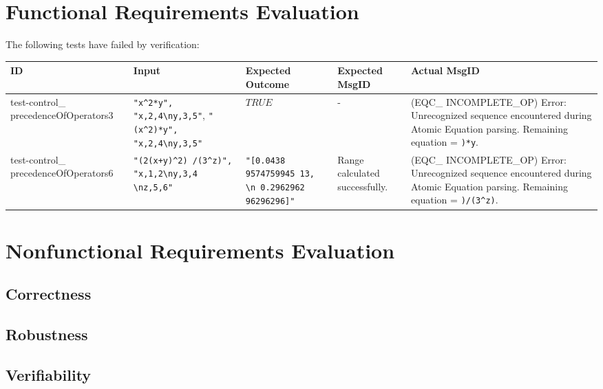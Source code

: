 \documentclass[12pt, titlepage]{article}
\begin{document}
\section{Functional Requirements Evaluation}

The following tests have failed by verification:

\begin{center}
	\begin{longtable}{ | p{3cm} | p{3cm} | p{2cm} | p{2cm} | p{3cm} |}
		 \hline \label{TblInputVar} 
		ID & Input & Expected Outcome & Expected MsgID & Actual MsgID \\ \hline
		test-control\_ precedenceOfOperators3 & \texttt{"x\textasciicircum2*y", 
			"x,2,4\textbackslash ny,3,5"}, \texttt{"(x\textasciicircum2)*y", 
			"x,2,4\textbackslash ny,3,5"} & $TRUE$ & - & (EQC\_ INCOMPLETE\_OP) 
			Error: Unrecognized sequence encountered during Atomic Equation 
			parsing. Remaining equation = \texttt{)*y}. \\ \hline
			
		test-control\_ precedenceOfOperators6 & 
		\texttt{"(2(x+y)\textasciicircum2) /(3\textasciicircum z)", 
		"x,1,2\textbackslash ny,3,4 \textbackslash nz,5,6"} & 
		\texttt{"[0.0438 9574759945 13, \textbackslash n 0.2962962 96296296]"} 
		& 
		Range calculated successfully. & (EQC\_ INCOMPLETE\_OP) Error: 
		Unrecognized sequence 
		encountered during Atomic Equation parsing. Remaining equation = 
		\texttt{)/(3\textasciicircum z)}. \\ \hline
	\end{longtable}
\end{center}

\section{Nonfunctional Requirements Evaluation}

\subsection{Correctness}

\subsection{Robustness}

\subsection{Verifiability}
\end{document}
